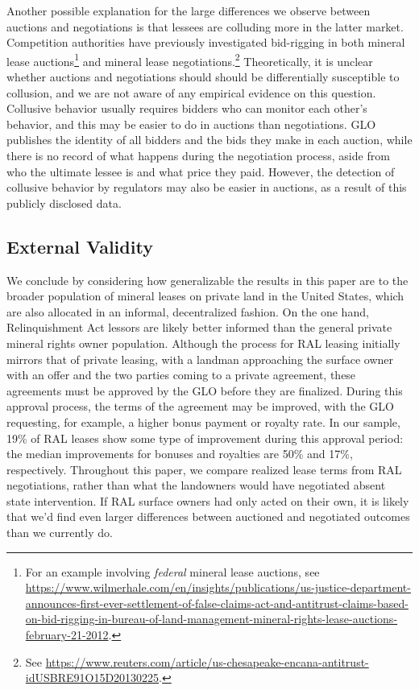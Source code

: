 \documentclass[12pt]{article}
\begin{document}
Another possible explanation for the large differences we observe between auctions and negotiations is that lessees are colluding more in the latter market. Competition authorities have previously investigated bid-rigging in both mineral lease auctions\footnote{For an example involving \textit{federal} mineral lease auctions, see \url{https://www.wilmerhale.com/en/insights/publications/us-justice-department-announces-first-ever-settlement-of-false-claims-act-and-antitrust-claims-based-on-bid-rigging-in-bureau-of-land-management-mineral-rights-lease-auctions-february-21-2012}.} and mineral lease negotiations.\footnote{See \url{https://www.reuters.com/article/us-chesapeake-encana-antitrust-idUSBRE91O15D20130225}.} Theoretically, it is unclear whether auctions and negotiations should should be differentially susceptible to collusion, and we are not aware of any empirical evidence on this question. Collusive behavior usually requires bidders who can monitor each other's behavior, and this may be easier to do in auctions than negotiations.  GLO publishes the identity of all bidders and the bids they make in each auction, while there is no record of what happens during the negotiation process, aside from who the ultimate lessee is and what price they paid. However, the detection of collusive behavior by regulators may also be easier in auctions, as a result of this publicly disclosed data. 

\subsection{External Validity}
We conclude by considering how generalizable the results in this paper are to the broader population of mineral leases on private land in the United States, which are also allocated in an informal, decentralized fashion. On the one hand, Relinquishment Act lessors are likely better informed than the general private mineral rights owner population. Although the process for RAL leasing initially mirrors that of private leasing, with a landman approaching the surface owner with an offer and the two parties coming to a private agreement, these agreements must be approved by the GLO before they are finalized. During this approval process, the terms of the agreement may be improved, with the GLO requesting, for example, a higher bonus payment or royalty rate. In our sample, 19\% of RAL leases show some type of improvement during this approval period: the median improvements for bonuses and royalties are 50\% and 17\%, respectively. Throughout this paper, we compare realized lease terms from RAL negotiations, rather than what the landowners would have negotiated absent state intervention.  If RAL surface owners had only acted on their own, it is likely that we'd find even larger differences between auctioned and negotiated outcomes than we currently do. 
\end{document}

